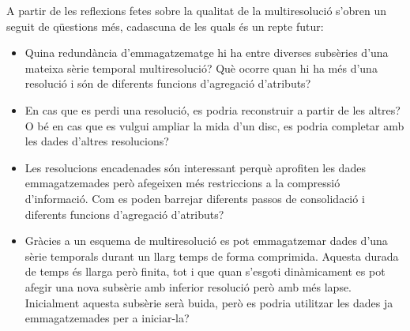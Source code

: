 A partir de les reflexions fetes sobre la qualitat de la
multiresolució s'obren un seguit de qüestions més, cadascuna de les
quals és un repte futur:
\begin{itemize}
\item Quina redundància d'emmagatzematge hi ha entre diverses
  subsèries d'una mateixa sèrie temporal multiresolució? Què ocorre
  quan hi ha més d'una resolució i són de diferents funcions
  d'agregació d'atributs?

\item En cas que es perdi una resolució, es podria reconstruir a
  partir de les altres? O bé en cas que es vulgui ampliar la mida d'un
  disc, es podria completar amb les dades d'altres resolucions?

\item Les resolucions encadenades són interessant perquè aprofiten les
  dades emmagatzemades però afegeixen més restriccions a la compressió
  d'informació. Com es poden barrejar diferents passos de consolidació
  i diferents funcions d'agregació d'atributs?


\item Gràcies a un esquema de multiresolució es pot emmagatzemar dades
  d'una sèrie temporals durant un llarg temps de forma
  comprimida. Aquesta durada de temps és llarga però finita, tot i que
  quan s'esgoti dinàmicament es pot afegir una nova subsèrie amb
  inferior resolució però amb més lapse. Inicialment aquesta subsèrie
  serà buida, però es podria utilitzar les dades ja emmagatzemades per
  a iniciar-la?

\end{itemize}
























